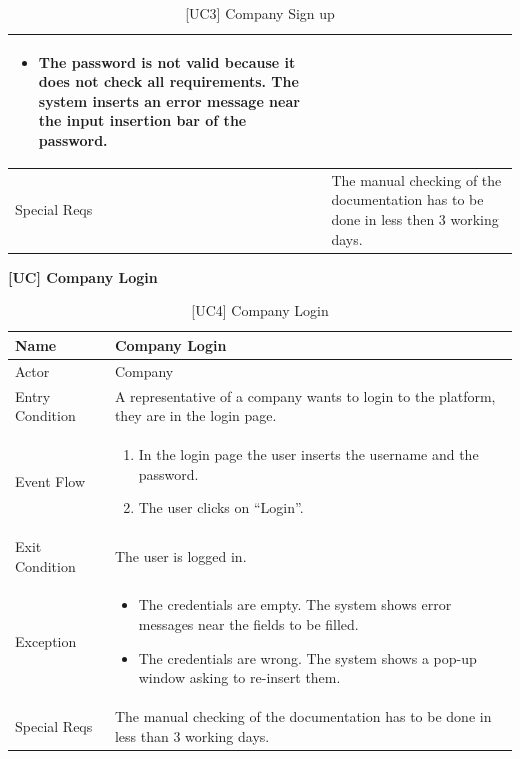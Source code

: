 \begin{table}[H]
\begin{tabular}{|p{3cm}|p{10cm}|}
\begin{itemize}
        \item [\text{(6)}] The password is not valid because it does not check all requirements. The system inserts an error message near the input insertion bar of the password.
    \end{itemize}
    \\ \hline
    Special Reqs  & The manual checking of the documentation has to be done in less then 3 working days. \\ \hline
    \end{tabular}
    \caption{[UC3] Company Sign up}
\end{table}

\textbf{[UC\nextUseCases] Company Login}
\begin{table}[H] %
    \centering
    \begin{tabular}{|p{3cm}|p{10cm}|}
    \hline
    Name & Company Login \\ \hline
    Actor  & Company\\ \hline
    Entry Condition  & A representative of a company wants to login to the platform, they are in the login page. \\ \hline
    Event Flow  & 
    \begin{enumerate}[noitemsep, topsep=0pt]
        \item In the login page the user inserts the username and the password.
        \item The user clicks on “Login”.
    \end{enumerate} \\ \hline
    Exit Condition  & The user is logged in. \\ \hline
    Exception  & 
    \begin{itemize}
        \item [\text{(2)}] The credentials are empty. The system shows error messages near the fields to be filled.
        \item [\text{(2)}] The credentials are wrong. The system shows a pop-up window asking to re-insert them.
    \end{itemize}
    \\ \hline
    Special Reqs  & The manual checking of the documentation has to be done in less than 3 working days. \\ \hline
    \end{tabular}
    \caption{[UC4] Company Login}
\end{table}

